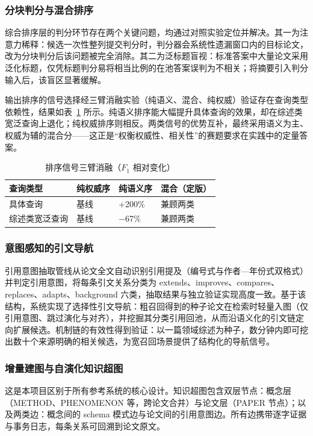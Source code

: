 \documentclass[12pt,a4paper]{ctexart}
\begin{document}
\subsubsection{分块判分与混合排序}

综合排序层的判分环节存在两个关键问题，均通过对照实验定位并解决。其一为注意力稀释：候选一次性整列提交判分时，判分器会系统性遗漏窗口内的目标论文，改为分块判分后该问题被完全消除。其二为泛标题盲视：标准答案中大量论文采用泛化标题，仅凭标题判分易将相当比例的在池答案误判为不相关；将摘要引入判分输入后，该盲区显著缓解。

输出排序的信号选择经三臂消融实验（纯语义、混合、纯权威）验证存在查询类型依赖性，结果如表~\ref{tab:arm} 所示。纯语义排序能大幅提升具体查询的效果，却在综述类宽泛查询上退化；纯权威排序则相反。两类信号的优势互补，最终采用语义为主、权威为辅的混合分——这正是“权衡权威性、相关性”的赛题要求在实践中的定量答案。

\begin{table}[htbp]
\centering
\small
\caption{排序信号三臂消融（$F_1$ 相对变化）}
\label{tab:arm}
\begin{tabularx}{\textwidth}{l X X X}
\toprule
查询类型 & 纯权威序 & 纯语义序 & 混合（定版） \tabularnewline
\midrule
具体查询 & 基线 & +200\% & 兼顾两类 \tabularnewline
综述类宽泛查询 & 基线 & −67\% & 兼顾两类 \tabularnewline
\bottomrule
\end{tabularx}
\end{table}

\subsubsection{意图感知的引文导航}

引用意图抽取管线从论文全文自动识别引用提及（编号式与作者—年份式双格式）并判定引用意图，将每条引文关系分类为 extends、improves、compares、replaces、adapts、background 六类，抽取结果与独立验证实现高度一致。基于该结构，系统实现了选择性引文导航：粗召回得到的种子论文在检索时轻量入图（仅引用意图、跳过演化与对齐），并挖掘其分类引用回池，从而沿语义化的引文链定向扩展候选。机制链的有效性得到验证：以一篇领域综述为种子，数分钟内即可挖出数十个来源明确的相关候选，为宽召回场景提供了结构化的导航信号。

\subsubsection{增量建图与自演化知识超图}

这是本项目区别于所有参考系统的核心设计。知识超图包含双层节点：概念层（METHOD、PHENOMENON 等，跨论文合并）与论文层（PAPER 节点）；以及两类边：概念间的 schema 模式边与论文间的引用意图边。所有边携带逐字证据与事务日志，每条关系可回溯到论文原文。
\end{document}

